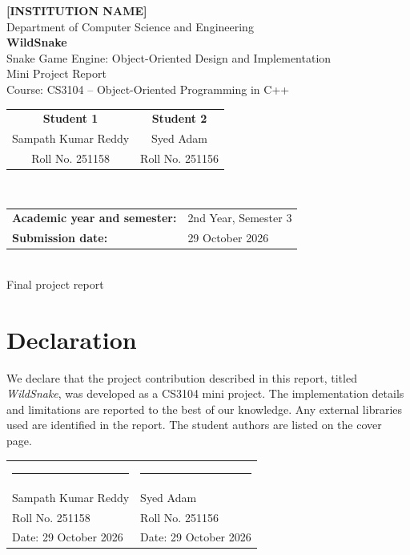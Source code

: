 \documentclass[12pt,a4paper]{report}
\begin{document}
\begin{titlepage}
  \centering
  {\Large \textbf{[INSTITUTION NAME]}}\\[3mm]
  {\large Department of Computer Science and Engineering}\\[18mm]
  {\Huge\bfseries WildSnake}\\[3mm]
  {\Large Snake Game Engine: Object-Oriented Design and Implementation}\\[18mm]
  {\large Mini Project Report}\\[2mm]
  {\large Course: CS3104 -- Object-Oriented Programming in C++}\\[16mm]
  \begin{tabular}{c@{\hspace{18mm}}c}
    \textbf{Student 1} & \textbf{Student 2}\\[3mm]
    \large Sampath Kumar Reddy & \large Syed Adam\\[2mm]
    Roll No. 251158 & Roll No. 251156
  \end{tabular}\\[12mm]
  \begin{tabular}{>{\bfseries}p{43mm}p{75mm}}
    Academic year and semester: & 2nd Year, Semester 3\\
    Submission date: & 29 October 2026
  \end{tabular}\\[20mm]
  \vfill
  {\large Final project report}
\end{titlepage}

\chapter*{Declaration}
We declare that the project contribution described in this report, titled
\textit{WildSnake}, was developed as a CS3104 mini project. The implementation
details and limitations are reported to the best of our knowledge. Any external
libraries used are identified in the report. The student authors are listed on
the cover page.

\vspace{15mm}
\begin{tabular}{p{70mm}p{70mm}}
  \rule{60mm}{0.4pt} & \rule{60mm}{0.4pt}\\
  Sampath Kumar Reddy & Syed Adam\\
  Roll No. 251158 & Roll No. 251156\\[3mm]
  Date: 29 October 2026 & Date: 29 October 2026
\end{tabular}
\end{document}

